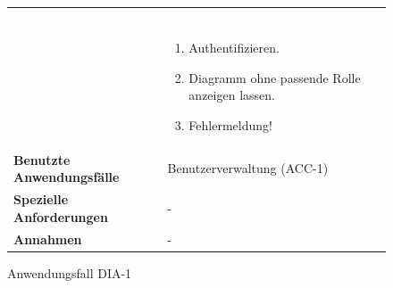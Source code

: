 \begin{figure}[h]
\begin{tabularx}{\textwidth}{ X | X }
\begin{enumerate}
		\end{enumerate} \\\cline{2-2} &
		\begin{enumerate} %
			\item Authentifizieren.
			\item Diagramm ohne passende Rolle anzeigen lassen.
			\item Fehlermeldung!
		\end{enumerate}  \\ \hline
		\textbf{Benutzte Anwendungsfälle} & Benutzerverwaltung (ACC-1) \\ \hline
		\textbf{Spezielle Anforderungen} & - \\ \hline
		\textbf{Annahmen} & -
	\end{tabularx}
	\caption{Anwendungsfall DIA-1}
	\label{fig:anwendungsfall-diagrammverwaltung-tabelle-DIA-1}
\end{figure}




\newpage

